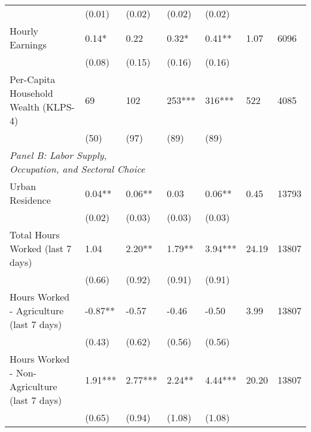 \documentclass[6pt,landscape]{article}
\newcommand{\sym}[1]{#1} %
\begin{document}
\begin{tabular}{lllllll}
            &      (0.01)         &      (0.02)         &      (0.02)         &      (0.02)         &                     &                     \\
Hourly Earnings&        0.14\sym{*}  &        0.22         &        0.32\sym{*}  &        0.41\sym{**} &        1.07         &     6096         \\
            &      (0.08)         &      (0.15)         &      (0.16)         &      (0.16)         &                     &                     \\
Per-Capita Household Wealth (KLPS-4)&          69         &         102         &         253\sym{***}&         316\sym{***}&         522         &        4085         \\
            &        (50)         &        (97)         &        (89)         &        (89)         &                     &                     \\
\midrule
\multicolumn{3}{l}{\emph{Panel B: Labor Supply, Occupation, and Sectoral Choice}} & \\ Urban Residence&        0.04\sym{**} &        0.06\sym{**} &        0.03         &        0.06\sym{**} &        0.45         &    13793          \\
            &      (0.02)         &      (0.03)         &      (0.03)         &      (0.03)         &                     &                     \\
Total Hours Worked (last 7 days)&        1.04         &        2.20\sym{**} &        1.79\sym{**} &        3.94\sym{***}&       24.19         &    13807         \\
            &      (0.66)         &      (0.92)         &      (0.91)         &      (0.91)         &                     &                     \\
Hours Worked - Agriculture (last 7 days)&       -0.87\sym{**} &       -0.57         &       -0.46         &       -0.50         &        3.99         &    13807         \\
            &      (0.43)         &      (0.62)         &      (0.56)         &      (0.56)         &                     &                     \\
Hours Worked - Non-Agriculture (last 7 days)&        1.91\sym{***}&        2.77\sym{***}&        2.24\sym{**} &        4.44\sym{***}&       20.20         &    13807         \\
            &      (0.65)         &      (0.94)         &      (1.08)         &      (1.08)         &                     &                     \\

\end{tabular}
\end{document}
